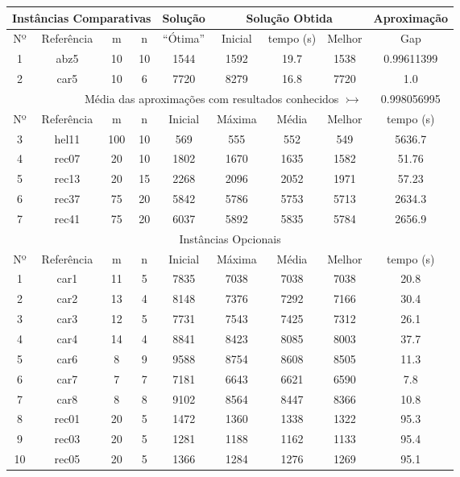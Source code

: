 	\begin{table}
	\centering
	\begin{tabular}{c|c|c|c||c||c|c|c||c}
	\hline\hline
	\multicolumn{4}{c||}{Instâncias Comparativas} & Solução 
	& \multicolumn{3}{|c||}{Solução Obtida} & Aproximação\\
	\hline
	Nº &  Referência & m & n & ``Ótima'' & Inicial & tempo (s) & Melhor & Gap\\
	\hline\hline
	1 & abz5 & 10 & 10 & 1544 & 1592 & 19.7 & 1538 & 0.99611399\\
	2 & car5 & 10 & 6 & 7720 & 8279 & 16.8 & 7720 & 1.0\\
	\hline\hline
	\multicolumn{8}{r||}{Média das aproximações com resultados conhecidos
	$\rightarrowtail$} & 0.998056995	\\
	\hline\hline
	Nº &  Referência & m & n & Inicial & Máxima & Média & Melhor & tempo (s)\\
	\hline\hline
	3 & hel11 & 100 & 10 & 569 & 555 & 552 & 549 & 5636.7 \\
	4 & rec07 & 20 & 10 & 1802 & 1670 & 1635 & 1582 & 51.76 \\
	5 & rec13 & 20 & 15 & 2268 & 2096 & 2052 & 1971 & 57.23 \\
	6 & rec37 & 75 & 20 & 5842 & 5786 & 5753 & 5713 & 2634.3 \\	
	7 & rec41 & 75 & 20 & 6037 & 5892 & 5835 & 5784 & 2656.9 \\
	\hline\hline
	\multicolumn{9}{c}{Instâncias Opcionais} \\
	\hline\hline
	Nº &  Referência & m & n & Inicial & Máxima & Média & Melhor & tempo (s)\\
	\hline\hline
	1 & car1 & 11 & 5 & 7835 & 7038 & 7038 & 7038 & 20.8 \\
	2 & car2 & 13 & 4 & 8148 & 7376 & 7292 & 7166 & 30.4 \\
	3 & car3 & 12 & 5 & 7731 & 7543 & 7425 & 7312 & 26.1 \\
	4 & car4 & 14 & 4 & 8841 & 8423 & 8085 & 8003 & 37.7 \\
	5 & car6 & 8 & 9 & 9588 & 8754 & 8608 & 8505 & 11.3 \\
	6 & car7 & 7 & 7 & 7181 & 6643 & 6621 & 6590 & 7.8 \\
	7 & car8 & 8 & 8 & 9102 & 8564 & 8447 & 8366 & 10.8 \\
	8 & rec01 & 20 & 5 & 1472 & 1360 & 1338 & 1322 & 95.3 \\
	9 & rec03 & 20 & 5 & 1281 & 1188 & 1162 & 1133 & 95.4 \\
	10 & rec05 & 20 & 5 & 1366 & 1284 & 1276 & 1269 & 95.1 \\
	\hline\hline
	\end{tabular}
	\end{table}
